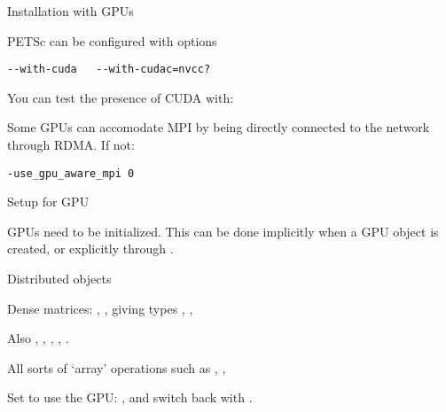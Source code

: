 
 {Installation with GPUs}

PETSc can be configured with options
\begin{verbatim}
--with-cuda   --with-cudac=nvcc?
\end{verbatim}
You can test the presence of CUDA with:


Some GPUs can accomodate MPI by being directly connected to the network
through  RDMA. If not:
\begin{verbatim}
-use_gpu_aware_mpi 0
\end{verbatim}

 {Setup for GPU}

GPUs need to be initialized.
This can be done implicitly when a GPU object is created,
or explicitly through .


 {Distributed objects}

Dense matrices:
,
,
giving types
,
,

Also
,
,
,
,
.

All sorts of `array' operations such as
,
,

Set  to use the GPU:
,
and switch back with
.

